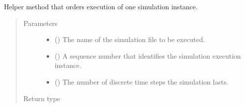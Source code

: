 \documentclass[letterpaper,10pt,english]{sphinxmanual}
\begin{document}
\begin{fulllineitems}
\label{\detokenize{app:app.hive_simulation.__start_simulation__}}
Helper method that orders execution of one simulation instance.
\begin{quote}\begin{description}
\item[{Parameters}] \leavevmode\begin{itemize}
\item {} 
 () \textendash{} The name of the simulation file to be executed.

\item {} 
 () \textendash{} A sequence number that identifies the simulation execution instance.

\item {} 
 () \textendash{} The number of discrete time steps the simulation lasts.

\end{itemize}

\item[{Return type}] \leavevmode
{}

\end{description}\end{quote}

\end{fulllineitems}

\end{document}
